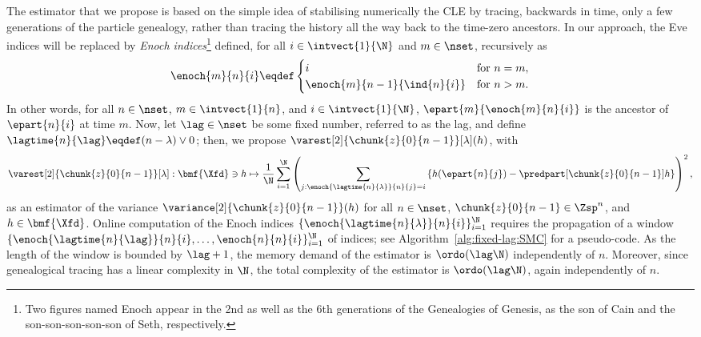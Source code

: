 The estimator that we propose is based on the simple idea of stabilising numerically the CLE by tracing, backwards in time, only a few generations of the particle genealogy, rather than tracing the history all the way back to the time-zero ancestors. In our approach, the Eve indices will be replaced by
\emph{Enoch indices}\footnote{Two figures named Enoch appear in the 2nd as well as the 6th generations of the Genealogies of Genesis, as the son of Cain and the son-son-son-son-son of Seth, respectively.} defined, for all $i \in \intvect{1}{\N}$ and $m \in \nset$, recursively as  
\begin{equation} \label{eq:def:Enoch}
\enoch{m}{n}{i} \eqdef 
\begin{cases}
i & \mbox{for } n = m, \\
\enoch{m}{n - 1}{\ind{n}{i}}  & \mbox{for } n > m.  
\end{cases}
\end{equation}
In other words, for all $n \in \nset$, $m \in \intvect{1}{n}$, and $i \in \intvect{1}{\N}$, $\epart{m}{\enoch{m}{n}{i}}$ is the ancestor of $\epart{n}{i}$ at time $m$. Now, let $\lag \in \nset$ be some fixed number, referred to as the lag, and define $\lagtime{n}{\lag} \eqdef (n - \lambda) \vee 0$; then, we propose $\varest[2]{\chunk{z}{0}{n - 1}}[\lambda](h)$, with  
\begin{equation} \label{eq:estimator}
\varest[2]{\chunk{z}{0}{n - 1}}[\lambda] : \bmf{\Xfd} \ni h \mapsto \frac{1}{\N} \sum_{i = 1}^\N \left( \sum_{j : \enoch{\lagtime{n}{\lambda}}{n}{j} = i} \left\{ h(\epart{n}{j}) - \predpart[\chunk{z}{0}{n - 1}] h \right\} \right)^2,
\end{equation}
as an estimator of the variance $\variance[2]{\chunk{z}{0}{n - 1}}(h)$ for all $n \in \nset$, $\chunk{z}{0}{n - 1} \in \Zsp^n$, and $h \in \bmf{\Xfd}$. 
Online computation of the Enoch indices $\{ \enoch{\lagtime{n}{\lambda}}{n}{i} \}_{i =1}^\N$ requires the propagation of a window $\{\enoch{\lagtime{n}{\lag}}{n}{i}, \ldots,  \enoch{n}{n}{i} \}_{i = 1}^\N$ of indices; see Algorithm~\ref{alg:fixed-lag:SMC} for a pseudo-code.  As the length of the window is bounded by $\lag + 1$, the memory demand of the estimator is $\ordo(\lag \N)$ independently of $n$. Moreover, since genealogical tracing has a linear complexity in $\N$, the total complexity of the estimator is $\ordo(\lag \N)$, again independently of $n$. 

